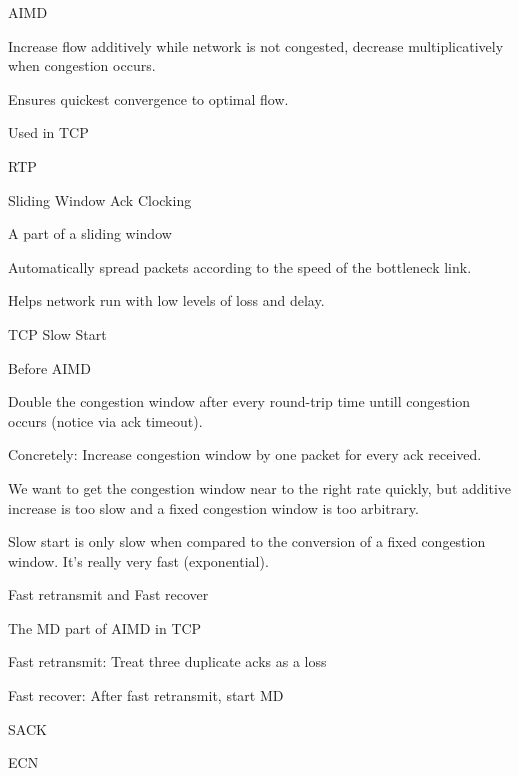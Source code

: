 \documentclass[main.tex]{subfiles}
\begin{document}
\begin{card}{AIMD}
\item Increase flow additively while network is not congested, decrease multiplicatively when congestion occurs.
\item Ensures quickest convergence to optimal flow.
\item Used in TCP
\end{card}

\begin{card}{RTP}
\TODO
\end{card}

\begin{card}{Sliding Window Ack Clocking}
\item A part of a sliding window
\item Automatically spread packets according to the speed of the bottleneck link.
\item Helps network run with low levels of loss and delay.
\end{card}

\begin{card}{TCP Slow Start}
\item Before AIMD
\item Double the congestion window after every round-trip time untill congestion occurs (notice via ack timeout).
\item Concretely: Increase congestion window by one packet for every ack received.
\item We want to get the congestion window near to the right rate quickly, but additive increase is too slow and a fixed congestion window is too arbitrary.
\item Slow start is only slow when compared to the conversion of a fixed congestion window. It's really very fast (exponential).
\end{card}

\begin{card}{Fast retransmit and Fast recover}
\item The MD part of AIMD in TCP
\item Fast retransmit: Treat three duplicate acks as a loss
\item Fast recover: After fast retransmit, start MD
\end{card}

\begin{card}{SACK}
\TODO
\end{card}

\begin{card}{ECN}
\TODO
\end{card}
\end{document}
